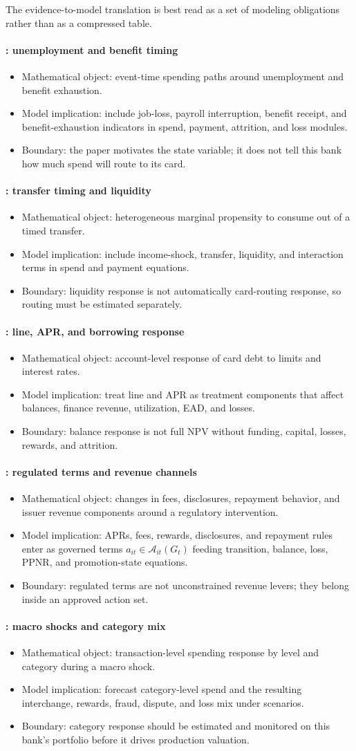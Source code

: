 \documentclass[11pt]{article}
\newcommand{\1}{\mathbf{1}}
\newcommand{\contractitem}[2]{\paragraph{#1}\begin{itemize}[leftmargin=1.5em,itemsep=0.12em,topsep=0.18em]#2\end{itemize}}
\begin{document}
The evidence-to-model translation is best read as a set of modeling
obligations rather than as a compressed table.
\contractitem{\citet{ganong2019unemployment}: unemployment and benefit timing}{
  \item Mathematical object: event-time spending paths around unemployment and
        benefit exhaustion.
  \item Model implication: include job-loss, payroll interruption, benefit
        receipt, and benefit-exhaustion indicators in spend, payment,
        attrition, and loss modules.
  \item Boundary: the paper motivates the state variable; it does not tell this
        bank how much spend will route to its card.
}
\contractitem{\citet{johnson2004rebates}: transfer timing and liquidity}{
  \item Mathematical object: heterogeneous marginal propensity to consume out
        of a timed transfer.
  \item Model implication: include income-shock, transfer, liquidity, and
        interaction terms in spend and payment equations.
  \item Boundary: liquidity response is not automatically card-routing
        response, so routing must be estimated separately.
}
\contractitem{\citet{gross2001liquidity}: line, APR, and borrowing response}{
  \item Mathematical object: account-level response of card debt to limits and
        interest rates.
  \item Model implication: treat line and APR as treatment components that
        affect balances, finance revenue, utilization, EAD, and losses.
  \item Boundary: balance response is not full NPV without funding, capital,
        losses, rewards, and attrition.
}
\contractitem{\citet{agarwal2013cardact}: regulated terms and revenue channels}{
  \item Mathematical object: changes in fees, disclosures, repayment behavior,
        and issuer revenue components around a regulatory intervention.
  \item Model implication: APRs, fees, rewards, disclosures, and repayment
        rules enter as governed terms
        $a_{it}\in\mathcal{A}_{it}(G_t)$ feeding transition, balance, loss,
        PPNR, and promotion-state equations.
  \item Boundary: regulated terms are not unconstrained revenue levers; they
        belong inside an approved action set.
}
\contractitem{\citet{baker2020epidemic}: macro shocks and category mix}{
  \item Mathematical object: transaction-level spending response by level and
        category during a macro shock.
  \item Model implication: forecast category-level spend and the resulting
        interchange, rewards, fraud, dispute, and loss mix under scenarios.
  \item Boundary: category response should be estimated and monitored on this
        bank's portfolio before it drives production valuation.
}
\end{document}
